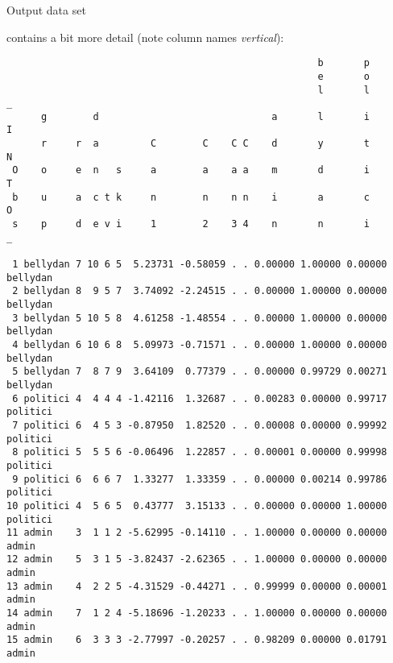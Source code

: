 \documentclass[pdf]{prosper}
\begin{document}
\begin{slide}{Output data set}

contains a bit more detail (note column names {\em vertical}):

{\tiny
\begin{verbatim}
                                                      b       p
                                                      e       o
                                                      l       l       _
      g        d                              a       l       i       I
      r     r  a         C        C    C C    d       y       t       N
 O    o     e  n   s     a        a    a a    m       d       i       T
 b    u     a  c t k     n        n    n n    i       a       c       O
 s    p     d  e v i     1        2    3 4    n       n       i       _

 1 bellydan 7 10 6 5  5.23731 -0.58059 . . 0.00000 1.00000 0.00000 bellydan
 2 bellydan 8  9 5 7  3.74092 -2.24515 . . 0.00000 1.00000 0.00000 bellydan
 3 bellydan 5 10 5 8  4.61258 -1.48554 . . 0.00000 1.00000 0.00000 bellydan
 4 bellydan 6 10 6 8  5.09973 -0.71571 . . 0.00000 1.00000 0.00000 bellydan
 5 bellydan 7  8 7 9  3.64109  0.77379 . . 0.00000 0.99729 0.00271 bellydan
 6 politici 4  4 4 4 -1.42116  1.32687 . . 0.00283 0.00000 0.99717 politici
 7 politici 6  4 5 3 -0.87950  1.82520 . . 0.00008 0.00000 0.99992 politici
 8 politici 5  5 5 6 -0.06496  1.22857 . . 0.00001 0.00000 0.99998 politici
 9 politici 6  6 6 7  1.33277  1.33359 . . 0.00000 0.00214 0.99786 politici
10 politici 4  5 6 5  0.43777  3.15133 . . 0.00000 0.00000 1.00000 politici
11 admin    3  1 1 2 -5.62995 -0.14110 . . 1.00000 0.00000 0.00000 admin   
12 admin    5  3 1 5 -3.82437 -2.62365 . . 1.00000 0.00000 0.00000 admin   
13 admin    4  2 2 5 -4.31529 -0.44271 . . 0.99999 0.00000 0.00001 admin   
14 admin    7  1 2 4 -5.18696 -1.20233 . . 1.00000 0.00000 0.00000 admin   
15 admin    6  3 3 3 -2.77997 -0.20257 . . 0.98209 0.00000 0.01791 admin   
\end{verbatim}
}
  
\end{slide}
\end{document}
